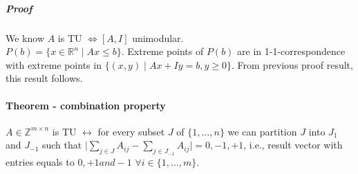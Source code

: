 \documentclass[main]{subfiles}
\begin{document}
\subparagraph{Proof}
We know $A$ is TU $\iff [A,I]$ unimodular.\\
$P(b) = \{x \in \mathbb{R}^{n} \mid Ax \leq b \}$. Extreme points of $P(b)$ are
in 1-1-correspondence with extreme points in $\{(x,y) \mid Ax + Iy = b, y \geq
0 \}$. From previous proof result, this result follows.

\paragraph{Theorem - combination property} $A \in \mathbb{Z}^{m \times n}$ is
TU $\leftrightarrow$ for every subset $J$ of $\{1, \dots, n\}$ we can partition
$J$ into $J_{1}$ and $J_{-1}$ such that $\mid \sum_{j \in J} A_{ij} -
\sum_{j \in J_{-1}} A_{ij} \mid = {0, -1, +1}$, i.e., result vector with
entries equals to $0, +1 and -1$ $\forall i \in \{1, \dots, m\}$.
\end{document}
